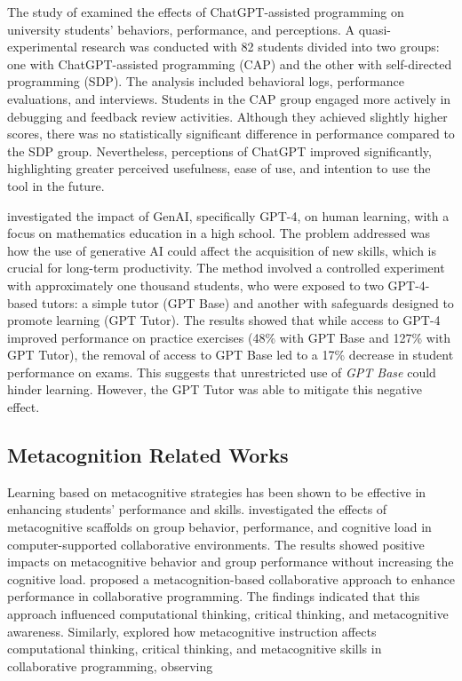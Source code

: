 \documentclass[sn-apa]{sn-jnl} %
\begin{document}
The study of \cite{Boudouaia24} examined the effects of ChatGPT-assisted
programming on university students' behaviors, performance, and perceptions.
A quasi-experimental research was conducted with 82 students divided into two
groups: one with ChatGPT-assisted programming (CAP) and the other with
self-directed programming (SDP). The analysis included behavioral logs,
performance evaluations, and interviews. Students in the CAP group engaged more
actively in debugging and feedback review activities. Although they achieved
slightly higher scores, there was no statistically significant difference in
performance compared to the SDP group. Nevertheless, perceptions of ChatGPT
improved significantly, highlighting greater perceived usefulness, ease of use,
and intention to use the tool in the future.

\cite{Bastani24} investigated the impact of GenAI, specifically GPT-4, on human
learning, with a focus on mathematics education in a high school. The problem
addressed was how the use of generative AI could affect the acquisition of new
skills, which is crucial for long-term productivity. The method involved a
controlled experiment with approximately one thousand students, who were exposed
to two GPT-4-based tutors: a simple tutor (GPT Base) and another with safeguards
designed to promote learning (GPT Tutor). The results showed that while access
to GPT-4 improved performance on practice exercises (48\% with GPT Base and
127\% with GPT Tutor), the removal of access to GPT Base led to a 17\% decrease
in student performance on exams. This suggests that unrestricted use of
\textit{GPT Base} could hinder learning. However, the GPT Tutor was able to
mitigate this negative effect.

\subsection{Metacognition Related Works}

Learning based on metacognitive strategies has been shown to be effective in
enhancing students’ performance and skills. \cite{Zheng19} investigated the
effects of metacognitive scaffolds on group behavior, performance, and cognitive
load in computer-supported collaborative environments. The results showed
positive impacts on metacognitive behavior and group performance without
increasing the cognitive load. \cite{LiWei23} proposed a metacognition-based
collaborative approach to enhance performance in collaborative programming. The
findings indicated that this approach influenced computational thinking,
critical thinking, and metacognitive awareness. Similarly, \cite{Wang23}
explored how metacognitive instruction affects computational thinking, critical
thinking, and metacognitive skills in collaborative programming, observing
\end{document}

